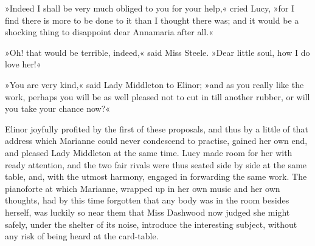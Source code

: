 »Indeed I shall be very much obliged to you for your help,« cried Lucy, »for I find there is more to be done to it than I thought there was; and it would be a shocking thing to disappoint dear Annamaria after all.«

»Oh! that would be terrible, indeed,« said Miss Steele. »Dear little soul, how I do love her!«

»You are very kind,« said Lady Middleton to Elinor; »and as you really like the work, perhaps you will be as well pleased not to cut in till another rubber, or will you take your chance now?«

Elinor joyfully profited by the first of these proposals, and thus by a little of that address which Marianne could never condescend to practise, gained her own end, and pleased Lady Middleton at the same time. Lucy made room for her with ready attention, and the two fair rivals were thus seated side by side at the same table, and, with the utmost harmony, engaged in forwarding the same work. The pianoforte at which Marianne, wrapped up in her own music and her own thoughts, had by this time forgotten that any body was in the room besides herself, was luckily so near them that Miss Dashwood now judged she might safely, under the shelter of its noise, introduce the interesting subject, without any risk of being heard at the card-table.